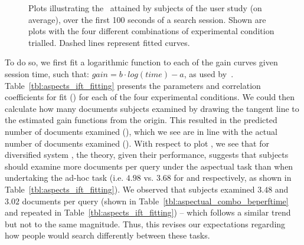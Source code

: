 \begin{figure}[t!]
    \centering
    \caption[\gls{acr:ift} and diversification: empirical results]{Plots illustrating the~ attained by subjects of the user study (on average), over the first 100 seconds of a search session. Shown are plots with the four different combinations of experimental condition trialled. Dashed lines represent fitted curves.\vspace*{-5mm}}
    \label{fig:ift_empirical}
\end{figure}

To do so, we first fit a logarithmic function to each of the gain curves given session time, such that: $gain = b \cdot log(time) - a$, as used by~\cite{athukorala2014ift}. Table~\ref{tbl:aspects_ift_fitting} presents the parameters and correlation coefficients for fit () for each of the four experimental conditions. We could then calculate how many documents subjects examined by drawing the tangent line to the estimated gain functions from the origin. This resulted in the predicted number of documents examined (), which we see are in line with the actual number of documents examined (). With respect to plot , we see that for diversified system , the theory, given their performance, suggests that subjects should examine more documents per query under the aspectual task  than when undertaking the ad-hoc task  (i.e. $4.98$ vs. $3.68$ for  and  respectively, as shown in Table~\ref{tbl:aspects_ift_fitting}). We observed that subjects examined $3.48$ and $3.02$ documents per query (shown in Table~\ref{tbl:aspectual_combo_beperftime} and repeated in Table~\ref{tbl:aspects_ift_fitting}) -- which follows a similar trend but not to the same magnitude. Thus, this revises our expectations regarding how people would search differently between these tasks.

